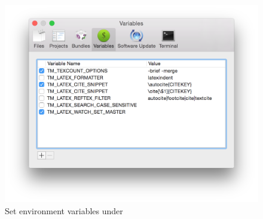 \documentclass[11pt, x11names]{article}
\begin{document}
\begin{figure}[h]
  \centering
    \includegraphics[width=.8\textwidth]{Figures/TextMate Preferences - Variables.png}
  \caption{Set environment variables under }
  \label{fig:Figures_TextMate_Preferences_-_Variables}
\end{figure}
\end{document}
